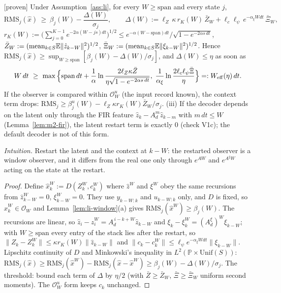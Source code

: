 \begin{remark}\label{rem:li-fading}
 [proven]
Under Assumption~\ref{ass:li}, for every $W\ge\mathrm{span}$ and every state $j$,
\[
\mathrm{RMS}_j(\hat x)\ \ge\ \beta_j(W)-\frac{\Delta(W)}{\sigma_j},\qquad
\Delta(W):=\ell_Z\,\kappa\,r_K(W)\,\bar Z_W+\ell_c\ell_\psi\,e^{-\alpha_\xi W dt}\,\bar\Xi_W,
\]
$r_K(W):=\big(\sum_{j=0}^{K-1}e^{-2\alpha(W-js)dt}\big)^{1/2}\le e^{-\alpha(W-\mathrm{span})dt}/\sqrt{1-e^{-2\alpha s\,dt}}$,
$\bar Z_W:=(\mathrm{mean}_{k\in S}\mathbb E\|\hat z_{k-W}\|^2)^{1/2}$, $\bar\Xi_W:=(\mathrm{mean}_{k\in S}\mathbb E\|\xi_{k-W}\|^2)^{1/2}$. Hence
$\mathrm{RMS}_j(\hat x)\ge\sup_{W\ge\mathrm{span}}[\beta_j(W)-\Delta(W)/\sigma_j]$, and $\Delta(W)\le\eta$ as soon as
\[
W\,dt\ \ge\ \max\Big\{\mathrm{span}\,dt+\frac1\alpha\ln\frac{2\ell_Z\kappa\bar Z}{\eta\sqrt{1-e^{-2\alpha s\,dt}}},\;
\frac1{\alpha_\xi}\ln\frac{2\ell_c\ell_\psi\bar\Xi}{\eta}\Big\}=:W_{\rm eff}(\eta)\,dt .
\]
If the observer is compared within $\mathcal O^u_W$ (the input record known), the context term drops:
$\mathrm{RMS}_j\ge\beta^u_j(W)-\ell_Z\kappa r_K(W)\bar Z_W/\sigma_j$.
(iii) If the decoder depends on the latent only through the FIR feature $\hat z_k-A_d^{m}\hat z_{k-m}$ with $m\,dt\le W$
(Lemma~\ref{lem:m2-fir}), the latent restart term is exactly $0$ (check V1c); the default decoder is not of this form.
\end{remark}
\emph{Intuition.} Restart the latent and the context at $k-W$: the restarted observer is a window observer, and it
differs from the real one only through $e^{AW}$ and $e^{A^\xi W}$ acting on the state at the restart.
\begin{proof}
Define $\hat x^W_k:=D(Z^W_k,c^W_k)$ where $\hat z^W$ and $\xi^W$ obey the same recursions from $\hat z^W_{k-W}=0$,
$\xi^W_{k-W}=0$. They use $y_{k-W:k}$ and $u_{k-W:k}$ only, and $D$ is fixed, so $\hat x^W_k\in\mathcal O_W$ and
Lemma~\ref{lem:li-window}(a) gives $\mathrm{RMS}_j(\hat x^W)\ge\beta_j(W)$. The recursions are linear, so
$\hat z_i-\hat z^W_i=A_d^{\,i-k+W}\hat z_{k-W}$ and $\xi_k-\xi^W_k=(A^\xi_d)^W\xi_{k-W}$; with $W\ge\mathrm{span}$ every
entry of the stack lies after the restart, so $\|Z_k-Z^W_k\|\le\kappa r_K(W)\|\hat z_{k-W}\|$ and
$\|c_k-c^W_k\|\le\ell_\psi e^{-\alpha_\xi W dt}\|\xi_{k-W}\|$. Lipschitz continuity of $D$ and Minkowski's inequality in
$L^2(\mathbb P\times\mathrm{Unif}(S))$: $\mathrm{RMS}_j(\hat x)\ge\mathrm{RMS}_j(\hat x^W)-\mathrm{RMS}_j(\hat x-\hat x^W)\ge\beta_j(W)-\Delta(W)/\sigma_j$.
The threshold: bound each term of $\Delta$ by $\eta/2$ (with $\bar Z\ge\bar Z_W$, $\bar\Xi\ge\bar\Xi_W$ uniform second
moments). The $\mathcal O^u_W$ form keeps $c_k$ unchanged.
\end{proof}

